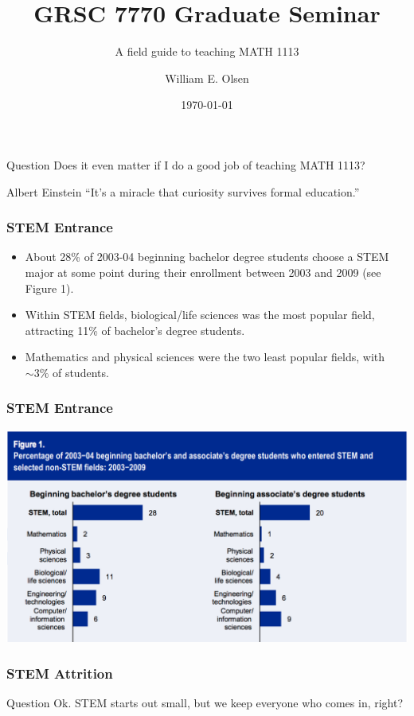 \documentclass{beamer}
\title{GRSC 7770 Graduate Seminar}
\subtitle{A field guide to teaching MATH 1113}
\author{William E. Olsen}
\date{\today}
\begin{document}
\frame{\titlepage}

\begin{frame}
  \begin{block}{Question}
    Does it even matter if I do a good job of teaching MATH 1113?
  \end{block}
\end{frame}

\begin{frame}
  \begin{block}{Albert Einstein}
    ``It's a miracle that curiosity survives formal education.''
  \end{block}
  
\end{frame}

\begin{frame}
  \frametitle{STEM Entrance}
  \begin{itemize}
  \item  About 28\% of 2003-04 beginning bachelor degree students choose a STEM major at some point during their enrollment between 2003 and 2009 (see Figure 1).
  \item Within STEM fields, biological/life sciences was the most popular field, attracting 11\% of bachelor's degree students.
  \item Mathematics and physical sciences were the two least popular fields, with $\sim 3\%$ of students. 
  \end{itemize}
\end{frame}

\begin{frame}
  \frametitle{STEM Entrance}
  \includegraphics[scale = 0.34]{fig1.png}
\end{frame}

\begin{frame}
  \frametitle{STEM Attrition}
  \begin{block}{Question}
    Ok. STEM starts out small, but we keep everyone who comes in, right?
  \end{block}
\end{frame}
\end{document}
